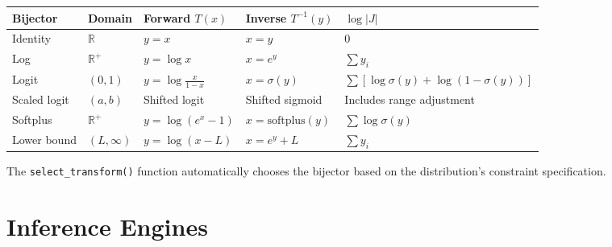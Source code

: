 \documentclass[
  11pt,
]{article}
\newcounter{none} %
\begin{document}
{\def\LTcaptype{none} %
\begin{longtable}[]{@{}
  >{\raggedright\arraybackslash}p{}
  >{\raggedright\arraybackslash}p{}
  >{\raggedright\arraybackslash}p{}
  >{\raggedright\arraybackslash}p{}
  >{\raggedright\arraybackslash}p{}@{}}
\toprule\noalign{}
\begin{minipage}[b]{\linewidth}\raggedright
Bijector
\end{minipage} & \begin{minipage}[b]{\linewidth}\raggedright
Domain
\end{minipage} & \begin{minipage}[b]{\linewidth}\raggedright
Forward \(T(x)\)
\end{minipage} & \begin{minipage}[b]{\linewidth}\raggedright
Inverse \(T^{-1}(y)\)
\end{minipage} & \begin{minipage}[b]{\linewidth}\raggedright
\(\log|J|\)
\end{minipage} \\
\midrule\noalign{}
\endhead
\bottomrule\noalign{}
\endlastfoot
Identity & \(\mathbb{R}\) & \(y = x\) & \(x = y\) & \(0\) \\
Log & \(\mathbb{R}^+\) & \(y = \log x\) & \(x = e^y\) & \(\sum y_i\) \\
Logit & \((0,1)\) & \(y = \log\frac{x}{1-x}\) & \(x = \sigma(y)\) &
\(\sum[\log\sigma(y) + \log(1-\sigma(y))]\) \\
Scaled logit & \((a,b)\) & Shifted logit & Shifted sigmoid & Includes
range adjustment \\
Softplus & \(\mathbb{R}^+\) & \(y = \log(e^x - 1)\) &
\(x = \text{softplus}(y)\) & \(\sum\log\sigma(y)\) \\
Lower bound & \((L, \infty)\) & \(y = \log(x - L)\) & \(x = e^y + L\) &
\(\sum y_i\) \\
\end{longtable}
}

The \texttt{select\_transform()} function automatically chooses the
bijector based on the distribution's constraint specification.

\section{Inference Engines}\label{inference-engines}
\end{document}
